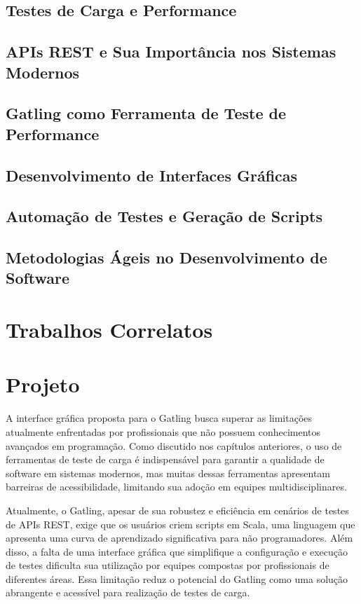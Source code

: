 \documentclass[
	12pt,
	openright,
	twoside,
	a4paper,
	english,
	brazil
	]{abntex2}
\begin{document}
\section{Testes de Carga e Performance}
\section{APIs REST e Sua Importância nos Sistemas Modernos}
\section{Gatling como Ferramenta de Teste de Performance}
\section{Desenvolvimento de Interfaces Gráficas}
\section{Automação de Testes e Geração de Scripts}
\section{Metodologias Ágeis no Desenvolvimento de Software}


\chapter{Trabalhos Correlatos} %



\chapter{Projeto} %
A interface gráfica proposta para o Gatling busca superar as limitações atualmente enfrentadas por profissionais que não possuem conhecimentos avançados em programação. Como discutido nos capítulos anteriores, o uso de ferramentas de teste de carga é indispensável para garantir a qualidade de software em sistemas modernos, mas muitas dessas ferramentas apresentam barreiras de acessibilidade, limitando sua adoção em equipes multidisciplinares.

Atualmente, o Gatling, apesar de sua robustez e eficiência em cenários de testes de APIs REST, exige que os usuários criem scripts em Scala, uma linguagem que apresenta uma curva de aprendizado significativa para não programadores. Além disso, a falta de uma interface gráfica que simplifique a configuração e execução de testes dificulta sua utilização por equipes compostas por profissionais de diferentes áreas. Essa limitação reduz o potencial do Gatling como uma solução abrangente e acessível para realização de testes de carga.
\end{document}
